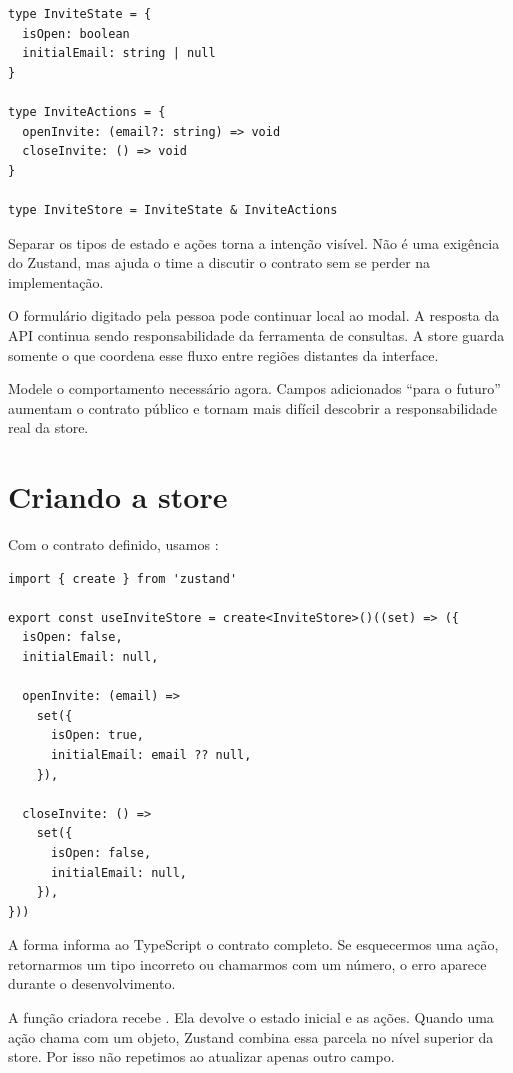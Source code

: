 \begin{lstlisting}[caption={Estado e ações do fluxo de convite.}]
type InviteState = {
  isOpen: boolean
  initialEmail: string | null
}

type InviteActions = {
  openInvite: (email?: string) => void
  closeInvite: () => void
}

type InviteStore = InviteState & InviteActions
\end{lstlisting}

Separar os tipos de estado e ações torna a intenção visível. Não é uma exigência
do Zustand, mas ajuda o time a discutir o contrato sem se perder na
implementação.

O formulário digitado pela pessoa pode continuar local ao modal. A resposta da
API continua sendo responsabilidade da ferramenta de consultas. A store guarda
somente o que coordena esse fluxo entre regiões distantes da interface.

\begin{decisao}
Modele o comportamento necessário agora. Campos adicionados ``para o futuro''
aumentam o contrato público e tornam mais difícil descobrir a responsabilidade
real da store.
\end{decisao}

\section{Criando a store}

Com o contrato definido, usamos :

\begin{lstlisting}[caption={Primeira store completa do fluxo de convite.},label={lst:invite-store}]
import { create } from 'zustand'

export const useInviteStore = create<InviteStore>()((set) => ({
  isOpen: false,
  initialEmail: null,

  openInvite: (email) =>
    set({
      isOpen: true,
      initialEmail: email ?? null,
    }),

  closeInvite: () =>
    set({
      isOpen: false,
      initialEmail: null,
    }),
}))
\end{lstlisting}

A forma  informa ao TypeScript o contrato
completo. Se esquecermos uma ação, retornarmos um tipo incorreto ou chamarmos
 com um número, o erro aparece durante o desenvolvimento.

A função criadora recebe . Ela devolve o estado inicial e as ações.
Quando uma ação chama  com um objeto, Zustand combina essa parcela no
nível superior da store. Por isso não repetimos  ao atualizar
apenas outro campo.

